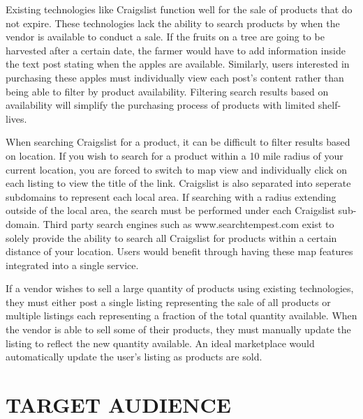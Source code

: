 \documentclass[letterpaper, 10 pt, conference]{ieeeconf}  %
\begin{document}
Existing technologies like Craigslist function well for the sale of products that do not expire. These technologies lack the ability to search products by when the vendor is available to conduct a sale. If the fruits on a tree are going to be harvested after a certain date, the farmer would have to add information inside the text post stating when the apples are available. Similarly, users interested in purchasing these apples must individually view each post's content rather than being able to filter by product availability. Filtering search results based on availability will simplify the purchasing process of products with limited shelf-lives.

When searching Craigslist for a product, it can be difficult to filter results based on location. If you wish to search for a product within a 10 mile radius of your current location, you are forced to switch to map view and individually click on each listing to view the title of the link. Craigslist is also separated into seperate subdomains to represent each local area. If searching with a radius extending outside of the local area, the search must be performed under each Craigslist sub-domain. Third party search engines such as www.searchtempest.com exist to solely provide the ability to search all Craigslist for products within a certain distance of your location. Users would benefit through having these map features integrated into a single service.

If a vendor wishes to sell a large quantity of products using existing technologies, they must either post a single listing representing the sale of all products or multiple listings each representing a fraction of the total quantity available. When the vendor is able to sell some of their products, they must manually update the listing to reflect the new quantity available. An ideal marketplace would automatically update the user's listing as products are sold.

\section{TARGET AUDIENCE}
\end{document}
